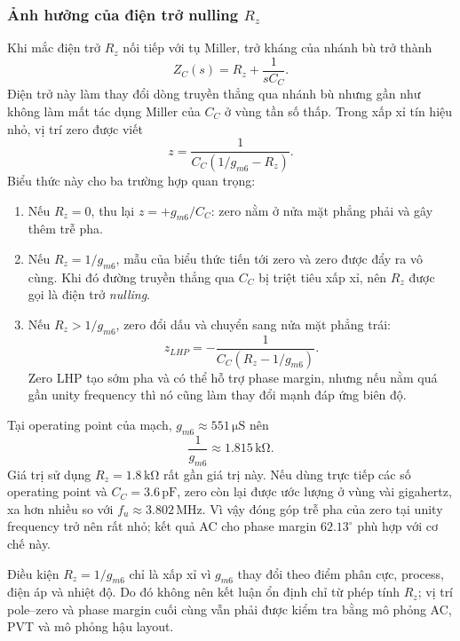 \documentclass[11pt,a4paper]{report}
\newcommand{\SI}[2]{\ensuremath{#1\,\mathrm{#2}}}
\newcommand{\ang}[1]{\ensuremath{#1^{\circ}}}
\newcommand{\micro}{\mu}\newcommand{\dd}{\mathrm d}\newcommand{\ohm}{\Omega}
\begin{document}
\subsubsection{Ảnh hưởng của điện trở nulling $R_z$}
Khi mắc điện trở $R_z$ nối tiếp với tụ Miller, trở kháng của nhánh bù trở thành
\begin{equation}
Z_C(s)=R_z+\frac{1}{sC_C}.
\end{equation}
Điện trở này làm thay đổi dòng truyền thẳng qua nhánh bù nhưng gần như không làm
mất tác dụng Miller của $C_C$ ở vùng tần số thấp. Trong xấp xỉ tín hiệu nhỏ,
vị trí zero được viết
\begin{equation}
\boxed{z=\frac{1}{C_C\left(1/g_{m6}-R_z\right)}}.
\end{equation}
Biểu thức này cho ba trường hợp quan trọng:
\begin{enumerate}[leftmargin=13mm]
\item Nếu $R_z=0$, thu lại $z=+g_{m6}/C_C$: zero nằm ở nửa mặt phẳng phải và
gây thêm trễ pha.
\item Nếu $R_z=1/g_{m6}$, mẫu của biểu thức tiến tới zero và zero được đẩy ra
vô cùng. Khi đó đường truyền thẳng qua $C_C$ bị triệt tiêu xấp xỉ, nên $R_z$
được gọi là điện trở \emph{nulling}.
\item Nếu $R_z>1/g_{m6}$, zero đổi dấu và chuyển sang nửa mặt phẳng trái:
\begin{equation}
z_{LHP}=-\frac{1}{C_C\left(R_z-1/g_{m6}\right)}.
\end{equation}
Zero LHP tạo sớm pha và có thể hỗ trợ phase margin, nhưng nếu nằm quá gần
unity frequency thì nó cũng làm thay đổi mạnh đáp ứng biên độ.
\end{enumerate}

Tại operating point của mạch, $g_{m6}\approx\SI{551}{\micro S}$ nên
\begin{equation}
\frac{1}{g_{m6}}\approx\SI{1.815}{k\ohm}.
\end{equation}
Giá trị sử dụng $R_z=\SI{1.8}{k\ohm}$ rất gần giá trị này. Nếu dùng trực tiếp
các số operating point và $C_C=\SI{3.6}{pF}$, zero còn lại được ước lượng ở
vùng vài gigahertz, xa hơn nhiều so với
$f_u\approx\SI{3.802}{MHz}$. Vì vậy đóng góp trễ pha của zero tại unity
frequency trở nên rất nhỏ; kết quả AC cho phase margin \ang{62.13} phù hợp với
cơ chế này.

Điều kiện $R_z=1/g_{m6}$ chỉ là xấp xỉ vì $g_{m6}$ thay đổi theo điểm phân cực,
process, điện áp và nhiệt độ. Do đó không nên kết luận ổn định chỉ từ phép tính
$R_z$; vị trí pole--zero và phase margin cuối cùng vẫn phải được kiểm tra bằng
mô phỏng AC, PVT và mô phỏng hậu layout.
\end{document}
